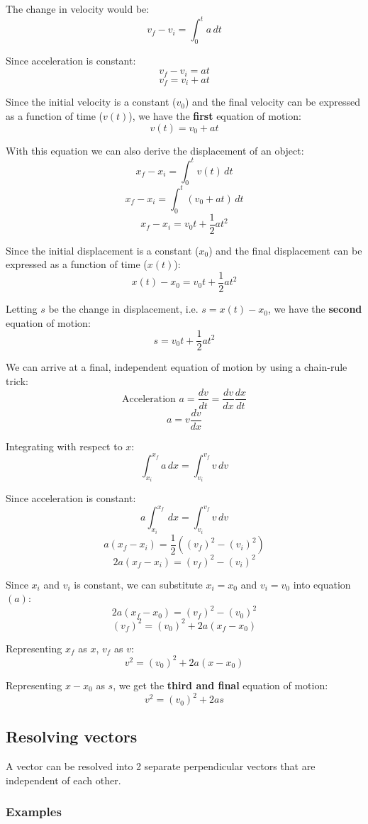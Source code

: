 \documentclass[11pt]{article}
\begin{document}
The change in velocity would be:
\[v_f - v_i = \int_0^t a \, dt\]

Since acceleration is constant:
\[v_f - v_i = at\]
\[v_f = v_i + at\]

Since the initial velocity is a constant (\(v_0\)) and the final velocity can be expressed as a function of time (\(v(t)\)), we have the \textbf{first} equation of motion:
\[v(t) = v_0 + at \tag{1}\]

With this equation we can also derive the displacement of an object:
\[x_f - x_i = \int_0^t v(t) \, dt\]
\[x_f - x_i = \int_0^t (v_0 + at) \, dt\]
\[x_f - x_i = v_0t + \frac{1}{2}at^2\]

Since the initial displacement is a constant (\(x_0\)) and the final displacement can be expressed as a function of time (\(x(t)\)):
\[x(t) - x_0 = v_0t + \frac{1}{2}at^2\]

Letting \(s\) be the change in displacement, i.e. \(s = x(t) - x_0\), we have the \textbf{second} equation of motion:
\[s = v_0t + \frac{1}{2}at^2 \tag{2}\]

We can arrive at a final, independent equation of motion by using a chain-rule trick:
\[\text{Acceleration } a = \frac{dv}{dt} = \frac{dv}{dx} \frac{dx}{dt}\]
\[a = v \frac{dv}{dx}\]

Integrating with respect to \(x\):
\[\int_{x_i}^{x_f} a \, dx = \int_{v_i}^{v_f} v \, dv\]

Since acceleration is constant:
\[a \int_{x_i}^{x_f} \, dx = \int_{v_i}^{v_f} v \, dv\]
\[a(x_f - x_i) = \frac{1}{2}((v_f)^2 - (v_i)^2)\]
\[2a(x_f - x_i) = (v_f)^2 - (v_i)^2 \tag{a}\]

Since \(x_i\) and \(v_i\) is constant, we can substitute \(x_i = x_0\) and \(v_i = v_0\) into equation \((a)\):
\[2a(x_f - x_0) = (v_f)^2 - (v_0)^2\]
\[(v_f)^2 = (v_0)^2 + 2a(x_f - x_0)\]

Representing \(x_f\) as \(x\), \(v_f\) as \(v\):
\[v^2 = (v_0)^2 + 2a(x - x_0)\]

Representing \(x - x_0\) as \(s\), we get the \textbf{third and final} equation of motion:
\[v^2 = (v_0)^2 + 2as \tag{3}\]

\newpage
\subsection{Resolving vectors}
\label{sec:orgc6f6fa1}
A vector can be resolved into 2 separate perpendicular vectors that are independent of each other.
\subsubsection{Examples}
\label{sec:org2fd7017}
\end{document}
